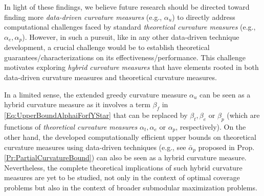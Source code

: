 \documentclass[letterpaper, 10 pt, conference]{ieeeconf}
\begin{document}
In light of these findings, we believe future research should be directed toward finding more \emph{data-driven curvature measures} (e.g., $\alpha_u$) to directly address computational challenges faced by standard \emph{theoretical curvature measures} (e.g., $\alpha_e,\alpha_p$). However, in such a pursuit, like in any other data-driven technique development, a crucial challenge would be to establish theoretical guarantees/characterizations on its effectiveness/performance. This challenge motivates exploring \emph{hybrid curvature measures} that have elements rooted in both data-driven curvature measures and theoretical curvature measures. 

In a limited sense, the extended greedy curvature measure $\alpha_u$ can be seen as a hybrid curvature measure as it involves a term $\beta_f$ in \eqref{Eq:UpperBoundAlphaiForfYStar} that can be replaced by $\beta_t,\beta_e$ or $\beta_p$ (which are functions of \emph{theoretical curvature measures} $\alpha_t,\alpha_e$ or $\alpha_p$, respectively). On the other hand, the developed computationally efficient upper bounds on theoretical curvature measures using data-driven techniques (e.g., see $\bar{\alpha}_p$ proposed in Prop. \ref{Pr:PartialCurvatureBound}) can also be seen as a hybrid curvature measure. Nevertheless, the complete theoretical implications of such hybrid curvature measures are yet to be studied, not only in the context of optimal coverage problems but also in the context of broader submodular maximization problems.      
\end{document}
